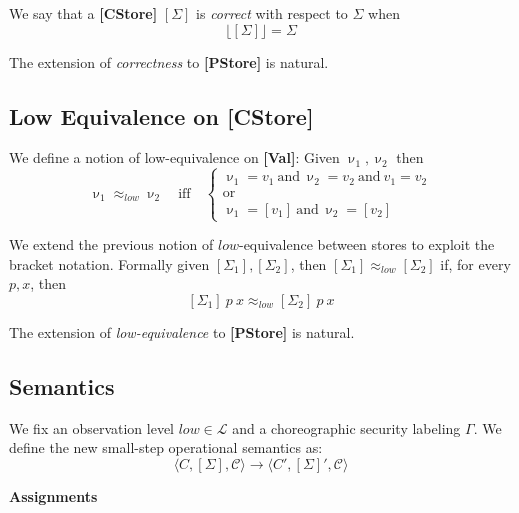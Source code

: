 \documentclass[12pt,a4paper,twoside]{book}
\newcommand{\MCL}{\mathscr{L}}
\begin{document}
We say that a \textbf{[CStore]} $[\Sigma]$ is \emph{correct} with respect to $\Sigma$ when
$$
\lfloor [\Sigma] \rfloor = \Sigma
$$

The extension of \emph{correctness} to \textbf{[PStore]} is natural.


\subsection{Low Equivalence on \textbf{[CStore]}}
We define a notion of low-equivalence on \textbf{[Val]}: Given $\upnu_1, \upnu_2$ then
\begin{equation}
\upnu_1 \approx_{low} \upnu_2
\quad\text{iff}\quad
\begin{cases}
\upnu_1 = v_1~\text{and}~\upnu_2 = v_2~\text{and}~v_1 = v_2\\
\text{or}\\
\upnu_1 = [v_1]~\text{and}~\upnu_2 = [v_2]
\end{cases}
\end{equation}

We extend the previous notion of $low$-equivalence between stores to exploit the bracket notation. Formally given $[\Sigma_1], [\Sigma_2]$, then $[\Sigma_1] \approx_{low} [\Sigma_2]$ if, for every $p, x$, then
$$
[\Sigma_1]~p~x \approx_{low} [\Sigma_2]~p~x
$$

The extension of \emph{low-equivalence} to \textbf{[PStore]} is natural.


\subsection{Semantics}

We fix an observation level $low \in \MCL$ and a choreographic security labeling $\Gamma$. We define the new small-step operational semantics as:
\[
	\langle C,[\Sigma],\mathscr{C} \rangle \rightarrow \langle C',[\Sigma]',\mathscr{C} \rangle
\]

\noindent\textbf{Assignments}
\begin{mathpar}


\end{mathpar}
\end{document}

